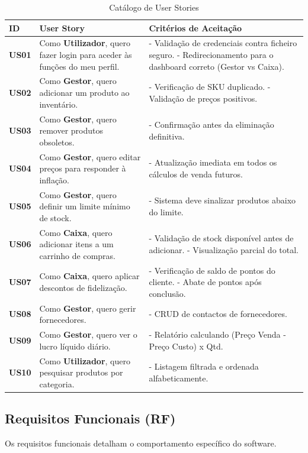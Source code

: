 \documentclass[runningheads,a4paper]{llncs}
\begin{document}
\begin{longtable}{p{} p{} p{}}
\caption{Catálogo de User Stories}\\
\hline
\rowcolor[gray]{0.9} \textbf{ID} & \textbf{User Story} & \textbf{Critérios de Aceitação} \\ \hline
\endhead
\textbf{US01} & Como \textbf{Utilizador}, quero fazer login para aceder às funções do meu perfil. & - Validação de credenciais contra ficheiro seguro. \newline - Redirecionamento para o dashboard correto (Gestor vs Caixa). \\ \hline
\textbf{US02} & Como \textbf{Gestor}, quero adicionar um produto ao inventário. & - Verificação de SKU duplicado. \newline - Validação de preços positivos. \\ \hline
\textbf{US03} & Como \textbf{Gestor}, quero remover produtos obsoletos. & - Confirmação antes da eliminação definitiva. \\ \hline
\textbf{US04} & Como \textbf{Gestor}, quero editar preços para responder à inflação. & - Atualização imediata em todos os cálculos de venda futuros. \\ \hline
\textbf{US05} & Como \textbf{Gestor}, quero definir um limite mínimo de stock. & - Sistema deve sinalizar produtos abaixo do limite. \\ \hline
\textbf{US06} & Como \textbf{Caixa}, quero adicionar itens a um carrinho de compras. & - Validação de stock disponível antes de adicionar. \newline - Visualização parcial do total. \\ \hline
\textbf{US07} & Como \textbf{Caixa}, quero aplicar descontos de fidelização. & - Verificação de saldo de pontos do cliente. \newline - Abate de pontos após conclusão. \\ \hline
\textbf{US08} & Como \textbf{Gestor}, quero gerir fornecedores. & - CRUD de contactos de fornecedores. \\ \hline
\textbf{US09} & Como \textbf{Gestor}, quero ver o lucro líquido diário. & - Relatório calculando (Preço Venda - Preço Custo) x Qtd. \\ \hline
\textbf{US10} & Como \textbf{Utilizador}, quero pesquisar produtos por categoria. & - Listagem filtrada e ordenada alfabeticamente. \\ \hline
\end{longtable}

\subsection{Requisitos Funcionais (RF)}
Os requisitos funcionais detalham o comportamento específico do software.
\end{document}
